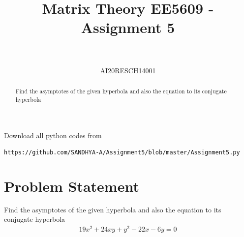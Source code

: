 \documentclass[journal,12pt,twocolumn]{IEEEtran}
\numberwithin{equation}{subsection}
\begin{document}
\title{Matrix Theory EE5609 - Assignment 5\\
}

\author{\\
 \\
AI20RESCH14001\\
 }

\maketitle
\begin{abstract}
 Find the asymptotes of the given hyperbola and also the equation to its conjugate hyperbola
\end{abstract}

Download all python codes from 
\begin{lstlisting}
https://github.com/SANDHYA-A/Assignment5/blob/master/Assignment5.py
\end{lstlisting}

\section{Problem Statement}
 Find the asymptotes of the given hyperbola and also the equation to its conjugate hyperbola
\begin{align}
19x^2 + 24xy+y^2-22x-6y=0 \label{1.1}
\end{align}
\end{document}
